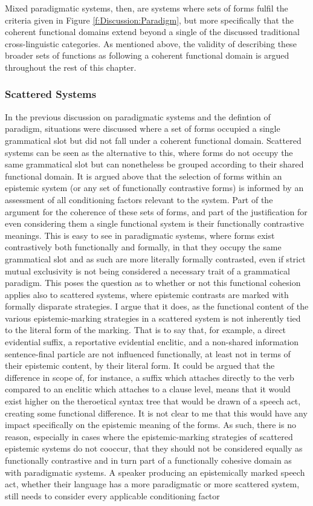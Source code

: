 Mixed paradigmatic systems, then, are systems where sets of forms fulfil the criteria given in Figure \ref{f:Discussion:Paradigm}, but more specifically that the coherent functional domains extend beyond a single of the discussed traditional cross-linguistic categories. As mentioned above, the validity of describing these broader sets of functions as following a coherent functional domain is argued throughout the rest of this chapter.

\subsubsection{Scattered Systems}\label{sss:Discussion:Scattered}
In the previous discussion on paradigmatic systems and the defintion of paradigm, situations were discussed where a set of forms occupied a single grammatical slot but did not fall under a coherent functional domain. Scattered systems can be seen as the alternative to this, where forms do not occupy the same grammatical slot but can nonetheless be grouped according to their shared functional domain. It is argued above that the selection of forms within an epistemic system (or any set of functionally contrastive forms) is informed by an assessment of all conditioning factors relevant to the system. Part of the argument for the coherence of these sets of forms, and part of the justification for even considering them a single functional system is their functionally contrastive meanings. This is easy to see in paradigmatic systems, where forms exist contrastively both functionally and formally, in that they occupy the same grammatical slot and as such are more literally formally contrasted, even if strict mutual exclusivity is not being considered a necessary trait of a grammatical paradigm. This poses the question as to whether or not this functional cohesion applies also to scattered systems, where epistemic contrasts are marked with formally disparate strategies. I argue that it does, as the functional content of the various epistemic-marking strategies in a scattered system is not inherently tied to the literal form of the marking. That is to say that, for example, a direct evidential suffix, a reportative evidential enclitic, and a non-shared information sentence-final particle are not influenced functionally, at least not in terms of their epistemic content, by their literal form. It could be argued that the difference in scope of, for instance, a suffix which attaches directly to the verb compared to an enclitic which attaches to a clause level, means that it would exist higher on the theroetical syntax tree that would be drawn of a speech act, creating some functional difference. It is not clear to me that this would have any impact specifically on the epistemic meaning of the forms. As such, there is no reason, especially in cases where the epistemic-marking strategies of scattered epistemic systems do not cooccur, that they should not be considered equally as functionally contrastive and in turn part of a functionally cohesive domain as with paradigmatic systems. A speaker producing an epistemically marked speech act, whether their language has a more paradigmatic or more scattered system, still needs to consider every applicable conditioning factor 